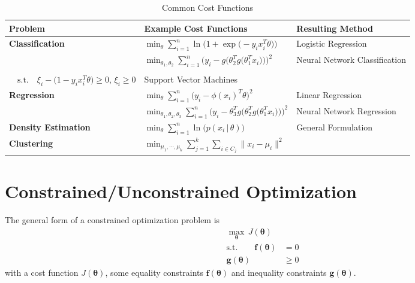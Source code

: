 \documentclass[a4paper, 11pt, accentcolor = tud3b]{tudreport}
\newcommand{\given}{\ensuremath{\,\vert\,}}
\renewcommand{\vec}[1]{\mathbf{#1}}
\begin{document}
				\begin{table}
					\centering
					\begin{tabular}{lll}
						\textbf{Problem} & \textbf{Example Cost Functions} & \textbf{Resulting Method} \\ \hline
						\textbf{Classification} & \( \min_\theta \sum_{i = 1}^{n} \ln\Big(1 \! + \exp\big(-y_ix_i^T\theta\big)\Big) \) & Logistic Regression \\
						& \( \min_{\theta_1, \theta_2} \sum_{i = 1}^{n} \bigg( \! y_i - g\Big( \theta_2^T g\big(\theta_1^T x_i\big) \Big) \! \bigg)^2 \) & Neural Network Classification \\
						& \makecell[l]{\(\min_\theta \lVert\theta\rVert^2 + C \sum_{i = 1}^{n} \xi_i\) \\ \( \quad\textrm{s.t.}\quad \xi_i - \big(1 - y_ix_i^T\theta\big) \geq 0,\, \xi_i \geq 0 \)} & Support Vector Machines \\
						\textbf{Regression} & \( \min_\theta \sum_{i = 1}^{n} \big(y_i - \phi(x_i)^T \theta\big)^2 \) & Linear Regression \\
						& \( \min_{\theta_1, \theta_2, \theta_3} \sum_{i = 1}^{n} \bigg( \! y_i - \theta_3^T g\Big( \theta_2^T g\big( \theta_1^T x_i \big) \Big) \! \bigg)^2 \) & Neural Network Regression \\
						\textbf{Density Estimation} & \( \min_\theta \sum_{i = 1}^{n} \ln\big(p(x_i \given \theta)\big) \) & General Formulation \\
						\textbf{Clustering} & \( \min_{\mu_1, \cdots, \mu_k} \sum_{j = 1}^{k} \sum_{i \in C_j} \lVert x_i - \mu_i \rVert ^2 \)
					\end{tabular}
					\caption{Common Cost Functions}
					\label{tab:costFunctions}
				\end{table}

		\section{Constrained/Unconstrained Optimization}
			The general form of a constrained optimization problem is
			\begin{align}
				\max\limits_{\vec{\theta}} \, J(\vec{\theta}) & \\
				\textrm{s.t.} \qquad
				\vec{f}(\vec{\theta}) & = 0 \\
				\vec{g}(\vec{\theta}) &\geq 0
			\end{align}
			with a cost function \(J(\vec{\theta})\), some equality constraints \(\vec{f}(\vec{\theta})\) and inequality constraints \(\vec{g}(\vec{\theta})\).
\end{document}

